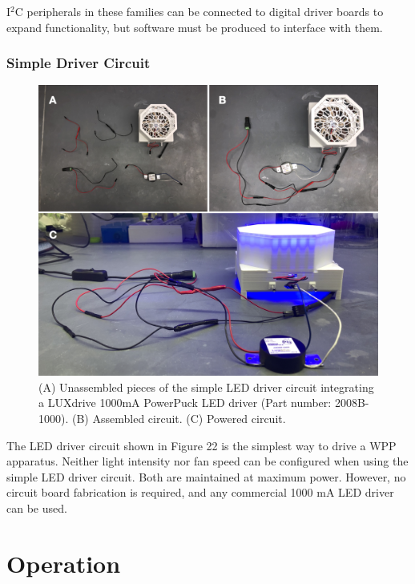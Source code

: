 \documentclass[11pt]{article}
\let\stdsection\section
\renewcommand\section{\clearpage\stdsection}
\begin{document}
I$^2$C peripherals in these families can be connected to digital driver boards to expand functionality, but software must be produced to interface with them.

\clearpage



\subsubsection{Simple Driver Circuit} \label{SEC:simple-driver}

\begin{figure}[H]
	\centering
	\includegraphics[width=\textwidth]{"./fign7.png"}
	\caption{(A) Unassembled pieces of the simple LED driver circuit integrating a LUXdrive 1000mA PowerPuck LED driver (Part number: 2008B-1000). (B) Assembled circuit. (C) Powered circuit.}
\end{figure}

The LED driver circuit shown in Figure 22 is the simplest way to drive a WPP apparatus.
Neither light intensity nor fan speed can be configured when using the simple LED driver circuit.
Both are maintained at maximum power.
However, no circuit board fabrication is required, and any commercial 1000 mA LED driver can be used.

\section{Operation}
\end{document}
